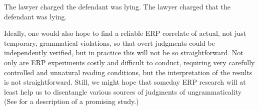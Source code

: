 \ea\label{ex:3:2}
\ea The lawyer charged the defendant was lying.
\ex The lawyer charged that the defendant was lying.
\z
\z

\noindent
Ideally, one would also hope to find a reliable ERP correlate of actual, not just temporary, grammatical violations, so that overt judgments could be independently verified, but in practice this will not be so straightforward. Not only are ERP experiments costly and difficult to conduct, requiring very carefully controlled and unnatural reading conditions, but the interpretation of the results is not straightforward.  Still, we  might  hope  that  someday  ERP research  will  at least
help us to disentangle various sources of judgments of ungrammaticality (See  for a description of a promising study.)

